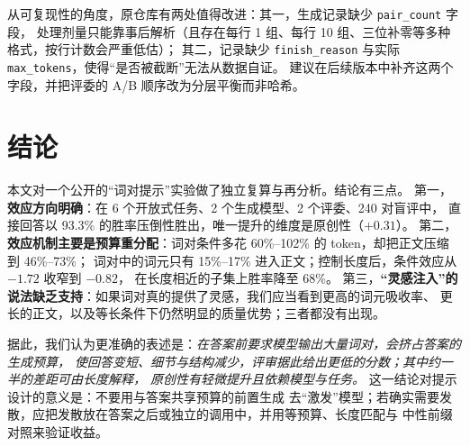 \documentclass[UTF8,11pt,a4paper]{ctexart}
\begin{document}
从可复现性的角度，原仓库有两处值得改进：其一，生成记录缺少 \texttt{pair\_count} 字段，
处理剂量只能靠事后解析（且存在每行 1 组、每行 10 组、三位补零等多种格式，按行计数会严重低估）；
其二，记录缺少 \texttt{finish\_reason} 与实际 \texttt{max\_tokens}，使得“是否被截断”无法从数据自证。
建议在后续版本中补齐这两个字段，并把评委的 A/B 顺序改为分层平衡而非哈希。

\section{结论}

本文对一个公开的“词对提示”实验做了独立复算与再分析。结论有三点。
第一，\textbf{效应方向明确}：在 6 个开放式任务、2 个生成模型、2 个评委、240 对盲评中，
直接回答以 93.3\% 的胜率压倒性胜出，唯一提升的维度是原创性（$+0.31$）。
第二，\textbf{效应机制主要是预算重分配}：词对条件多花 60\%--102\% 的 token，却把正文压缩到 46\%--73\%；
词对中的词元只有 15\%--17\% 进入正文；控制长度后，条件效应从 $-1.72$ 收窄到 $-0.82$，
在长度相近的子集上胜率降至 68\%。
第三，\textbf{“灵感注入”的说法缺乏支持}：如果词对真的提供了灵感，我们应当看到更高的词元吸收率、
更长的正文，以及等长条件下仍然明显的质量优势；三者都没有出现。

据此，我们认为更准确的表述是：\emph{在答案前要求模型输出大量词对，会挤占答案的生成预算，
使回答变短、细节与结构减少，评审据此给出更低的分数；其中约一半的差距可由长度解释，
原创性有轻微提升且依赖模型与任务。} 这一结论对提示设计的意义是：不要用与答案共享预算的前置生成
去“激发”模型；若确实需要发散，应把发散放在答案之后或独立的调用中，并用等预算、长度匹配与
中性前缀对照来验证收益。
\end{document}
